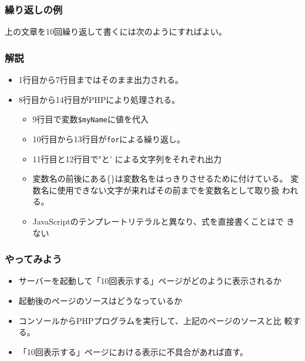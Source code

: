 \begin{frame}[containsverbatim]
 \frametitle{繰り返しの例}
 上の文章を10回繰り返して書くには次のようにすればよい。
\end{frame}
\begin{frame}[containsverbatim]
 \frametitle{解説}
 \begin{itemize}
  \item 1行目から7行目まではそのまま出力される。
  \item 8行目から14行目がPHPにより処理される。
   \begin{itemize}
    \item 9行目で変数\Verb+$myName+に値を代入
    \item 10行目から13行目が\texttt{for}による繰り返し。
    \item 11行目と12行目で"と' による文字列をそれぞれ出力 %
    \item 変数名の前後にある\{\}は変数名をはっきりさせるために付けている。
          変数名に使用できない文字が来ればその前までを変数名として取り扱
          われる。
    \item JavaScriptのテンプレートリテラルと異なり、式を直接書くことはで
          きない
   \end{itemize}
 \end{itemize}
\end{frame}
\begin{frame}[containsverbatim]
 \frametitle{やってみよう}
 \begin{itemize}
  \item サーバーを起動して「10回表示する」ページがどのように表示されるか
  \item 起動後のページのソースはどうなっているか
  \item コンソールからPHPプログラムを実行して、上記のページのソースと比
        較する。
  \item 「10回表示する」ページにおける表示に不具合があれば直す。
 \end{itemize}
\end{frame}
 
\begin{frame}[containsverbatim]
\frametitle{}
\end{frame}
